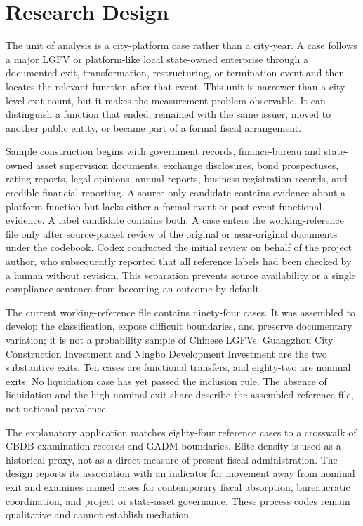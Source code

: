 \section{Research Design}

The unit of analysis is a city-platform case rather than a city-year. A case
follows a major LGFV or platform-like local state-owned enterprise through a
documented exit, transformation, restructuring, or termination event and then
locates the relevant function after that event. This unit is narrower than a
city-level exit count, but it makes the measurement problem observable. It can
distinguish a function that ended, remained with the same issuer, moved to
another public entity, or became part of a formal fiscal arrangement.

Sample construction begins with government records, finance-bureau and
state-owned asset supervision documents, exchange disclosures, bond
prospectuses, rating reports, legal opinions, annual reports, business
registration records, and credible financial reporting. A source-only
candidate contains evidence about a platform function but lacks either a formal
event or post-event functional evidence. A label candidate contains both. A
case enters the working-reference file only after source-packet review of the
original or near-original documents under the codebook. Codex conducted the
initial review on behalf of the project author, who subsequently reported
that all reference labels had been checked by a human without revision. This separation prevents source
availability or a single compliance sentence from becoming an outcome by
default.

The current working-reference file contains ninety-four cases. It was assembled to
develop the classification, expose difficult boundaries, and preserve
documentary variation; it is not a probability sample of Chinese LGFVs.
Guangzhou City Construction Investment and Ningbo Development Investment are
the two substantive exits. Ten cases are functional transfers, and eighty-two
are nominal exits. No liquidation case has yet passed the inclusion rule. The
absence of liquidation and the high nominal-exit share describe the assembled
reference file, not national prevalence.

The explanatory application matches eighty-four reference cases to a crosswalk
of CBDB examination records and GADM boundaries. Elite density is used as a
historical proxy, not as a direct measure of present fiscal administration.
The design reports its association with an indicator for movement away from
nominal exit and examines named cases for contemporary fiscal absorption,
bureaucratic coordination, and project or state-asset governance. These process
codes remain qualitative and cannot establish mediation.


